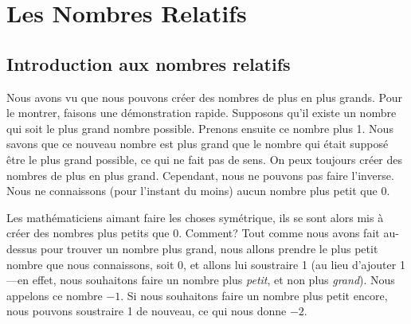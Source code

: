 \chapter{Les Nombres Relatifs}


\section{Introduction aux nombres relatifs}

Nous avons vu que nous pouvons créer des nombres de plus en plus grands. Pour le montrer, faisons une démonstration rapide. Supposons qu'il existe un nombre qui soit le plus grand nombre possible. Prenons ensuite ce nombre plus 1. Nous savons que ce nouveau nombre est plus grand que le nombre qui était supposé être le plus grand possible, ce qui ne fait pas de sens. On peux toujours créer des nombres de plus en plus grand. Cependant, nous ne pouvons pas faire l'inverse. Nous ne connaissons (pour l'instant du moins) aucun nombre plus petit que 0.

\begin{center}
\end{center}

\noindent Les mathématiciens aimant faire les choses symétrique, ils se sont alors mis à créer des nombres plus petits que 0. Comment? Tout comme nous avons fait au-dessus pour trouver un nombre plus grand, nous allons prendre le plus petit nombre que nous connaissons, soit 0, et allons lui soustraire 1 (au lieu d'ajouter 1---en effet, nous souhaitons faire un nombre plus {\em petit}, et non plus {\em grand}). Nous appelons ce nombre $-1$. Si nous souhaitons faire un nombre plus petit encore, nous pouvons soustraire 1 de nouveau, ce qui nous donne $-2$.

\begin{center}
\end{center}

